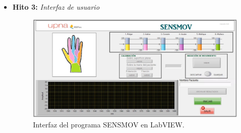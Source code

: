 \begin{itemize} [label=]
\begin{enumerate}
		\item Realizar los ejercicio de rehabilitación con normalidad
		\item Pulsar el botón \underline{\textit{PAUSAR}}
	\end{enumerate}
		\hspace{1cm}\textbf{FINALIZACIÓN:}
	\begin{enumerate}
		\setcounter{enumi}{16}
		\item Pulsar el botón \underline{\textit{ARCHIVAR RESULTADOS}}
		\item Pulsar el botón \underline{\textit{SALIR}}
		\item Elegir en la pestaña emergente el nombre de archivo y carpeta para el informe de la sesión.
	\end{enumerate}

	\textit{\underline{Nota:}} Otro contratiempo encontrado en este prototipo son los problemas que da el software del interrogador, saltando alertas de error en la señal que no permiten seguir con la ejecución. Durante el desarrollo del proyecto se ha conseguido intuir el procedimiento en el que dichas alertas saltan con menos frecuencia y de ello surgen ciertos pasos del protocolo de medida. Por ejemplo, cuando se conecta el splitter a la fuente una vez que ya está en funcionamiento el software se reduce el número de veces en el que emergen las alertas.
	
	\textcolor{rositaoscuro}{Esto me parece importante comentarlo, el problema que da el software al iniciarlo. Tengo apuntadas las descripciones de los fallos, pero creo que igual es demasiado }
	
	\item \textbf{Hito 3:} \textit{Interfaz de usuario}
	
	\begin{figure}[H]
		\centering
		\includegraphics[width=1\textwidth]{./img/interfazSMinicio}
		\caption{Interfaz del programa SENSMOV en LabVIEW.}
		\label{fig:interfazinicio}
	\end{figure}
	 

\end{itemize}
